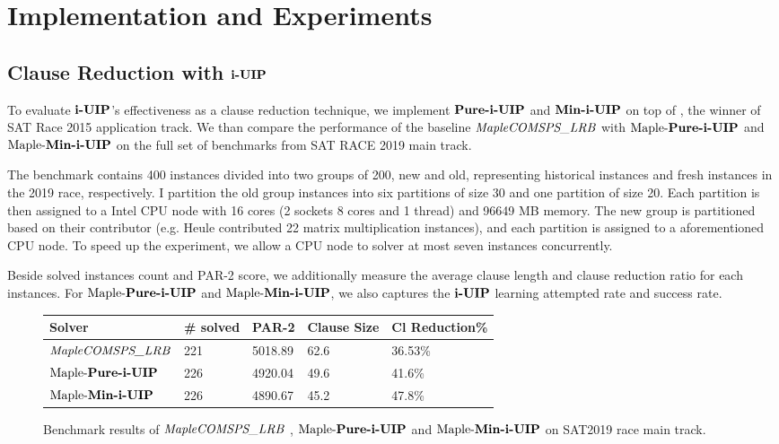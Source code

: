 \section{Implementation and Experiments}

\subsection{Clause Reduction with $\textbf{i-UIP}$}
To evaluate $\textbf{i-UIP}$'s effectiveness as a clause reduction technique, we implement  $\textbf{Pure-i-UIP}$ and $\textbf{Min-i-UIP}$  on top of \text{\MapleBase} \cite{}, the winner of SAT Race 2015 application track.  We than compare the performance of the baseline $\textit{MapleCOMSPS\_LRB}$ with $\text{Maple-\textbf{Pure-i-UIP}}$ and $\text{Maple-\textbf{Min-i-UIP}}$ on the full set of benchmarks from SAT RACE 2019 main track.

The benchmark contains 400 instances divided into two groups of 200, new and old, representing historical instances and fresh instances in the 2019 race, respectively. I partition the old group instances into six partitions of size 30 and one partition of size 20. Each partition is then assigned to a Intel CPU node with 16 cores (2 sockets 8 cores  and  1 thread) and 96649 MB memory. The new group is partitioned based on their contributor (e.g. Heule contributed 22 matrix multiplication instances), and each partition is assigned to a aforementioned CPU node. To speed up the experiment, we allow a CPU node to solver at most seven instances concurrently. 

Beside solved instances count and PAR-2 score, we additionally measure the average clause length and clause reduction ratio for each instances. For $\text{Maple-\textbf{Pure-i-UIP}}$  and $\text{Maple-\textbf{Min-i-UIP}}$, we also captures the $\textbf{i-UIP}$ learning attempted rate and success rate.

\begin{figure} 
\begin{center}
\begin{tabular}{ | m{3.5cm} | m{2cm}| m{2cm} | m{2cm} | m{2.5cm} | } 
\hline
Solver & \# solved & PAR-2 & Clause Size & Cl Reduction\% \\ 
\hline
$\textit{MapleCOMSPS\_LRB}$ & 221 & 5018.89 & 62.6 & 36.53\% \\ 
\hline
$\text{Maple-\textbf{Pure-i-UIP}}$ & 226 & 4920.04 & 49.6 & 41.6\% \\ 
\hline
$\text{Maple-\textbf{Min-i-UIP}}$ & 226 & 4890.67 & 45.2 & 47.8\%\\ 
\hline
\end{tabular}
\end{center}
\caption{Benchmark results of $\textit{MapleCOMSPS\_LRB}$ , $\text{Maple-\textbf{Pure-i-UIP}}$  and $\text{Maple-\textbf{Min-i-UIP}}$ on SAT2019 race main track.}
\label{fig:t1}
\end{figure}

